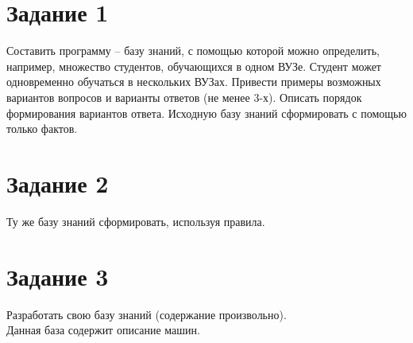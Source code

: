 \newpage

\newpage
\section*{Задание 1}

\Large Составить программу – базу знаний, с помощью которой можно определить, например, множество студентов, обучающихся в одном ВУЗе. Студент может одновременно обучаться в нескольких ВУЗах. Привести примеры возможных вариантов вопросов и варианты ответов (не менее 3-х). Описать порядок формирования вариантов ответа. Исходную базу знаний сформировать с помощью только фактов.  
\newline



\section*{Задание 2}

\Large Ту же базу знаний сформировать, используя правила.
  




\section*{Задание 3}

\Large Разработать свою базу знаний (содержание произвольно). 
\\Данная база содержит описание машин.





    